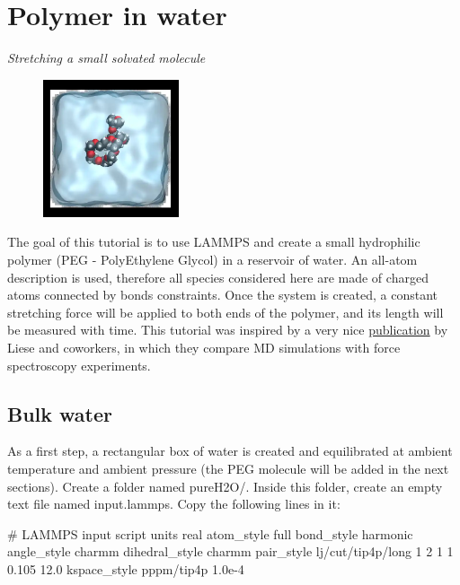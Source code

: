\chapter{Polymer in water}

\vspace{-1cm} \noindent \textcolor{graytitle}{\textit{{\Large Stretching a small solvated molecule}}\vspace{0.5cm} }

\noindent \hspace{-0.45cm}\begin{figure}
\includegraphics[width=4cm]{tutorials/level2/polymer-in-water/video-PEG-light.png}
\end{figure}

\noindent The goal of this tutorial is to use LAMMPS and
create a small hydrophilic polymer (PEG -
PolyEthylene Glycol) in a reservoir of water. 
An all-atom description is used, therefore all species considered here
are made of charged atoms connected by bonds constraints.
Once the system is created, a constant stretching force will be applied to both
ends of the polymer, and its length will be measured with time.
This tutorial was inspired by a very nice \href{https://doi.org/10.1021/acsnano.6b07071}{publication} by Liese and coworkers, in which
they compare MD simulations with force spectroscopy experiments.

\section{Bulk water}

\noindent As a first step, a rectangular box of water is created and
equilibrated at ambient temperature and ambient pressure (the PEG molecule will be added in the next sections).
Create a folder named pureH2O/. Inside this folder, create
an empty text file named input.lammps. Copy the following
lines in it:

\begin{lcverbatim}
# LAMMPS input script
units real
atom_style full
bond_style harmonic
angle_style charmm
dihedral_style charmm
pair_style lj/cut/tip4p/long 1 2 1 1 0.105 12.0
kspace_style pppm/tip4p 1.0e-4
\end{lcverbatim}


